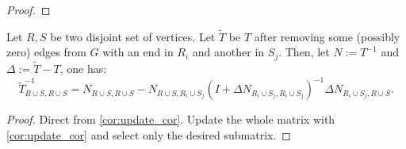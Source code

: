 \begin{proof}
\end{proof}

\begin{theorem}[Update 2]
\label{update:2}
    Let \(R, S\) be two disjoint set of vertices. Let \(\tilde{T}\) be \(T\) after removing some (possibly zero) edges from \(G\) with an end in \(R_i\) and another in \(S_j\).
    Then, let \(N := T^{-1}\) and \(\Delta := \tilde{T} - T\), one has:
    \[
        {\tilde{T}}^{-1}_{R \cup S, R \cup S} = N_{R \cup S, R \cup S} - N_{R \cup S, R_i \cup S_j}(I + \Delta N_{R_i \cup S_j, R_i \cup S_j})^{-1} \Delta N_{R_i \cup S_j, R \cup S}.
    \]
\end{theorem}

\begin{proof}
    Direct from \cref{cor:update_cor}. Update the whole matrix with \ref{cor:update_cor} and select only the desired submatrix.
\end{proof}

